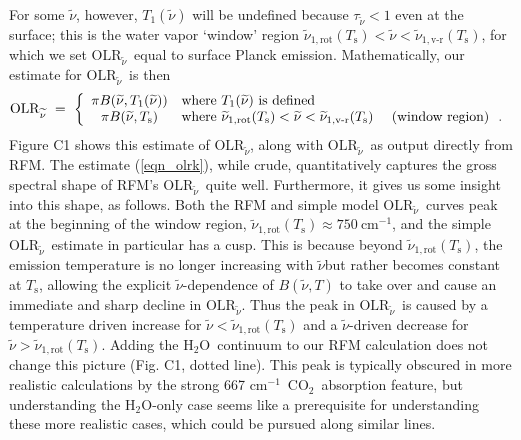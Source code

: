 \documentclass{ametsoc}
\newcommand{\beqn}{\begin{equation}}
\newcommand{\eeqn}{\end{equation}}
\newcommand{\eqnref}[1]{(\ref{#1})}
\newcommand{\cminverse}{\ensuremath{\mathrm{cm^{-1}}}}
\newcommand{\Ts}{\ensuremath{T_\mathrm{s}}}
\newcommand{\cotwo}{\ensuremath{\mathrm{CO_2}}}
\newcommand{\htwo}{\ensuremath{\mathrm{H_2O}}}
\newcommand{\wv}{\ensuremath{\widetilde{\nu}}}
\newcommand{\OLRk}{\ensuremath{\mathrm{OLR}_{\wv}}}
\newcommand{\tauk}{\ensuremath{\tau_{\wv}}}
\newcommand{\konerot}{\ensuremath{\wv_{1,\mathrm{rot}}}}
\newcommand{\konevr}{\ensuremath{\wv_{1,\text{v-r}}}}
\begin{document}
 For some \wv, however,  $T_1(\wv)$ will be undefined because $\tauk<1$ even at the surface; this is the water vapor `window' region $\konerot(\Ts) < \wv < \konevr(\Ts)$, for which we set \OLRk\ equal to surface Planck emission.  Mathematically, our estimate for  \OLRk\ is then 
\beqn
	\OLRk \ =  \ \left\{ \begin{array}{cl} \pi B(\wv,T_1(\wv)) & \mbox{where $T_1(\wv)$ is defined} \\
														\pi B(\wv,\Ts) & \mbox{where $\konerot(\Ts) < \wv < \konevr(\Ts)$ \quad (window region) \ .} 
								\end{array}						
					   \right .
	\label{eqn_olrk}
\eeqn
Figure C1 shows this estimate of \OLRk, along with \OLRk\ as output directly from RFM. The estimate \eqnref{eqn_olrk}, while crude, quantitatively captures the gross spectral shape of RFM's \OLRk\ quite well. Furthermore, it gives us some insight into this shape, as follows. Both the RFM and simple model \OLRk\ curves peak at the beginning of the window region, $\konerot(\Ts) \approx 750\ \cminverse$, and the simple  \OLRk\ estimate in particular has a cusp. This is because beyond $\konerot(\Ts)$,   the emission temperature is no longer increasing with \wv but rather becomes constant at \Ts,  allowing the explicit \wv-dependence of $B(\wv,T)$ to take over and cause an immediate and sharp decline in \OLRk. Thus the peak in \OLRk\ is caused by a temperature driven increase for $\wv<\konerot(\Ts)$ and a \wv-driven decrease for $\wv>\konerot(\Ts)$.  Adding the \htwo\ continuum to our RFM calculation does not change this picture (Fig. C1, dotted line). This peak is typically obscured in more realistic calculations by the strong 667 \cminverse\ \cotwo\ absorption feature, but understanding the \htwo-only case seems like a prerequisite for understanding these more realistic cases, which could be pursued along similar lines.





\end{document}

